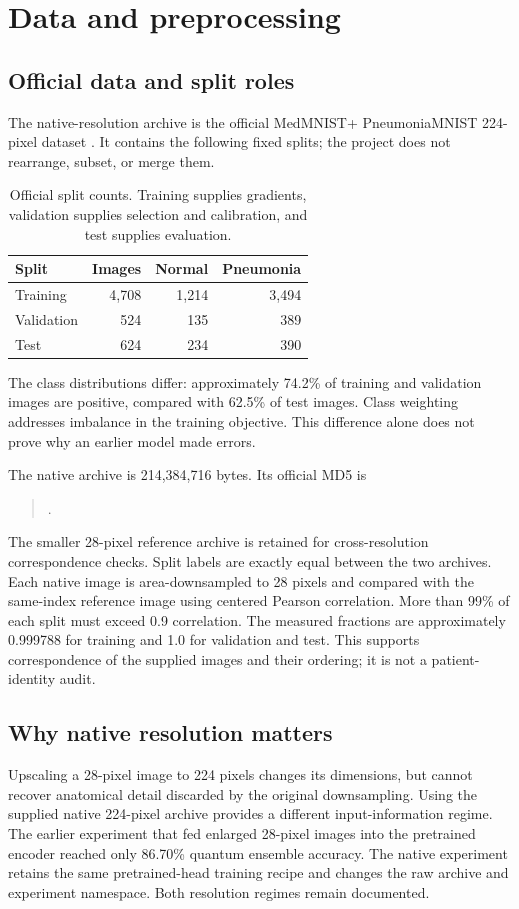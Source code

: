 \documentclass[11pt,a4paper]{report}
\newcommand{\code}[1]{\texttt{\detokenize{#1}}}
\begin{document}
\chapter{Data and preprocessing}
\section{Official data and split roles}
The native-resolution archive is the official MedMNIST+ PneumoniaMNIST 224-pixel dataset \cite{medmnist}. It contains the following fixed splits; the project does not rearrange, subset, or merge them.
\begin{table}[htbp]\centering
\begin{tabular}{lrrr}\toprule
Split & Images & Normal & Pneumonia\\\midrule
Training & 4,708 & 1,214 & 3,494\\
Validation & 524 & 135 & 389\\
Test & 624 & 234 & 390\\\bottomrule
\end{tabular}
\caption{Official split counts. Training supplies gradients, validation supplies selection and calibration, and test supplies evaluation.}
\end{table}
The class distributions differ: approximately 74.2\% of training and validation images are positive, compared with 62.5\% of test images. Class weighting addresses imbalance in the training objective. This difference alone does not prove why an earlier model made errors.

The native archive is 214,384,716 bytes. Its official MD5 is
\begin{quote}\small\code{d6a3c71de1b945ea11211b03746c1fe1}.\end{quote}
The smaller 28-pixel reference archive is retained for cross-resolution correspondence checks. Split labels are exactly equal between the two archives. Each native image is area-downsampled to 28 pixels and compared with the same-index reference image using centered Pearson correlation. More than 99\% of each split must exceed 0.9 correlation. The measured fractions are approximately 0.999788 for training and 1.0 for validation and test. This supports correspondence of the supplied images and their ordering; it is not a patient-identity audit.

\section{Why native resolution matters}
Upscaling a 28-pixel image to 224 pixels changes its dimensions, but cannot recover anatomical detail discarded by the original downsampling. Using the supplied native 224-pixel archive provides a different input-information regime. The earlier experiment that fed enlarged 28-pixel images into the pretrained encoder reached only 86.70\% quantum ensemble accuracy. The native experiment retains the same pretrained-head training recipe and changes the raw archive and experiment namespace. Both resolution regimes remain documented.
\end{document}
